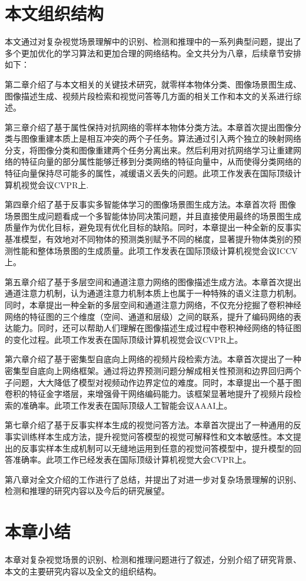 \section{本文组织结构}
本文通过对复杂视觉场景理解中的识别、检测和推理中的一系列典型问题，提出了多个更加优化的学习算法和更加合理的网络结构。全文共分为八章，后续章节安排如下：

\begin{asparaitem}

\item 第二章介绍了与本文相关的关键技术研究，就零样本物体分类、图像场景图生成、图像描述生成、视频片段检索和视觉问答等几方面的相关工作和本文的关系进行综述。

\item 第三章介绍了基于属性保持对抗网络的零样本物体分类方法。本章首次提出图像分类与图像重建本质上是相互冲突的两个子任务。算法通过引入两个独立的映射网络分支，将图像分类和图像重建两个任务分离出来。然后利用对抗网络学习让重建网络的特征向量的部分属性能够迁移到分类网络的特征向量中，从而使得分类网络的特征向量保持尽可能多的属性，减缓语义丢失的问题。此项工作发表在国际顶级计算机视觉会议CVPR上.

\item 第四章介绍了基于反事实多智能体学习的图像场景图生成方法。本章首次将
图像场景图生成问题看成一个多智能体协同决策问题，并且直接使用最终的场景图生成质量作为优化目标，避免现有优化目标的缺陷。同时，本章提出一种全新的反事实基准模型，有效地对不同物体的预测类别赋予不同的梯度，显著提升物体类别的预测性能和整体场景图的生成质量。此项工作发表在国际顶级计算机视觉会议ICCV上。

\item 第五章介绍了基于多层空间和通道注意力网络的图像描述生成方法。本章首次提出通道注意力机制，认为通道注意力机制本质上也属于一种特殊的语义注意力机制。同时，本章提出一种全新的多层空间和通道注意力网络，不仅充分挖掘了卷积神经网络的特征图的三个维度（空间、通道和层级）之间的联系，提升了编码网络的表达能力。同时，还可以帮助人们理解在图像描述生成过程中卷积神经网络的特征图的变化过程。此项工作发表在国际顶级计算机视觉会议CVPR上。

\item 第六章介绍了基于密集型自底向上网络的视频片段检索方法。本章首次提出了一种密集型自底向上网络框架。通过将边界预测问题分解成相关性预测和边界回归两个子问题，大大降低了模型对视频动作边界定位的难度。同时，本章提出一个基于图卷积的特征金字塔层，来增强骨干网络编码能力。该框架显著地提升了视频片段检索的准确率。此项工作发表在国际顶级人工智能会议AAAI上。

\item 第七章介绍了基于反事实样本生成的视觉问答方法。本章首次提出了一种通用的反事实训练样本生成方法，提升视觉问答模型的视觉可解释性和文本敏感性。本文提出的反事实样本生成机制可以无缝地运用到任意的视觉问答模型中，提升模型的回答准确率。此项工作已经发表在国际顶级计算机视觉大会CVPR上。

\item 第八章对全文介绍的工作进行了总结，并提出了对进一步对复杂场景理解的识别、检测和推理的研究内容以及今后的研究展望。

\end{asparaitem}

\section{本章小结}
本章对复杂视觉场景的识别、检测和推理问题进行了叙述，分别介绍了研究背景、本文的主要研究内容以及全文的组织结构。

